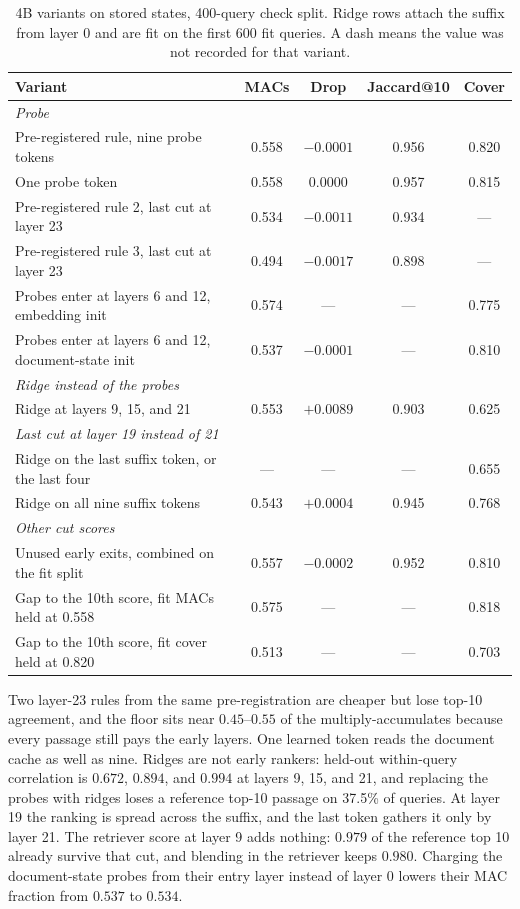 \documentclass[11pt, a4paper]{article}
\newcommand{\grp}[1]{\multicolumn{5}{l}{\emph{#1}}\\}
\begin{document}
\begin{table}[t]
\centering
\small
\caption{4B variants on stored states, 400-query check split. Ridge rows attach the suffix from layer 0 and are fit on the first 600 fit queries. A dash means the value was not recorded for that variant.}
\label{tab:variants}
\begin{tabular}{lcccc}
\toprule
Variant & MACs & Drop & Jaccard@10 & Cover \\
\midrule
\grp{Probe}
Pre-registered rule, nine probe tokens & 0.558 & $-0.0001$ & 0.956 & 0.820 \\
One probe token & 0.558 & $0.0000$ & 0.957 & 0.815 \\
Pre-registered rule 2, last cut at layer 23 & 0.534 & $-0.0011$ & 0.934 & --- \\
Pre-registered rule 3, last cut at layer 23 & 0.494 & $-0.0017$ & 0.898 & --- \\
Probes enter at layers 6 and 12, embedding init & 0.574 & --- & --- & 0.775 \\
Probes enter at layers 6 and 12, document-state init & 0.537 & $-0.0001$ & --- & 0.810 \\
\midrule
\grp{Ridge instead of the probes}
Ridge at layers 9, 15, and 21 & 0.553 & $+0.0089$ & 0.903 & 0.625 \\
\midrule
\grp{Last cut at layer 19 instead of 21}
Ridge on the last suffix token, or the last four & --- & --- & --- & 0.655 \\
Ridge on all nine suffix tokens & 0.543 & $+0.0004$ & 0.945 & 0.768 \\
\midrule
\grp{Other cut scores}
Unused early exits, combined on the fit split & 0.557 & $-0.0002$ & 0.952 & 0.810 \\
Gap to the 10th score, fit MACs held at 0.558 & 0.575 & --- & --- & 0.818 \\
Gap to the 10th score, fit cover held at 0.820 & 0.513 & --- & --- & 0.703 \\
\bottomrule
\end{tabular}
\end{table}

Two layer-23 rules from the same pre-registration are cheaper but lose top-10 agreement, and the floor sits near $0.45$--$0.55$ of the multiply-accumulates because every passage still pays the early layers.
One learned token reads the document cache as well as nine.
Ridges are not early rankers: held-out within-query correlation is $0.672$, $0.894$, and $0.994$ at layers 9, 15, and 21, and replacing the probes with ridges loses a reference top-10 passage on 37.5\% of queries.
At layer 19 the ranking is spread across the suffix, and the last token gathers it only by layer 21.
The retriever score at layer 9 adds nothing: $0.979$ of the reference top 10 already survive that cut, and blending in the retriever keeps $0.980$.
Charging the document-state probes from their entry layer instead of layer 0 lowers their MAC fraction from $0.537$ to $0.534$.
\end{document}
